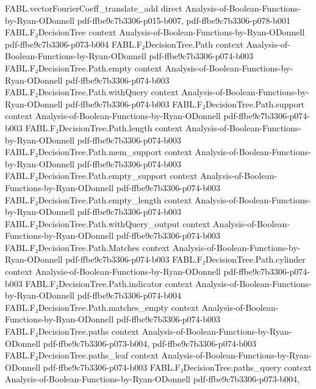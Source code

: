 \begin{theorem}
  {FABL.vectorFourierCoeff_translate_add}
  {direct}
  {Analysis-of-Boolean-Functions-by-Ryan-ODonnell}
  {pdf-ffbe9c7b3306-p015-b007,
    pdf-ffbe9c7b3306-p078-b001}
\proofstep
  {FABL.F₂DecisionTree}
  {context}
  {Analysis-of-Boolean-Functions-by-Ryan-ODonnell}
  {pdf-ffbe9c7b3306-p073-b004}
\proofstep
  {FABL.F₂DecisionTree.Path}
  {context}
  {Analysis-of-Boolean-Functions-by-Ryan-ODonnell}
  {pdf-ffbe9c7b3306-p074-b003}
\proofstep
  {FABL.F₂DecisionTree.Path.empty}
  {context}
  {Analysis-of-Boolean-Functions-by-Ryan-ODonnell}
  {pdf-ffbe9c7b3306-p074-b003}
\proofstep
  {FABL.F₂DecisionTree.Path.withQuery}
  {context}
  {Analysis-of-Boolean-Functions-by-Ryan-ODonnell}
  {pdf-ffbe9c7b3306-p074-b003}
\proofstep
  {FABL.F₂DecisionTree.Path.support}
  {context}
  {Analysis-of-Boolean-Functions-by-Ryan-ODonnell}
  {pdf-ffbe9c7b3306-p074-b003}
\proofstep
  {FABL.F₂DecisionTree.Path.length}
  {context}
  {Analysis-of-Boolean-Functions-by-Ryan-ODonnell}
  {pdf-ffbe9c7b3306-p074-b003}
\proofstep
  {FABL.F₂DecisionTree.Path.mem_support}
  {context}
  {Analysis-of-Boolean-Functions-by-Ryan-ODonnell}
  {pdf-ffbe9c7b3306-p074-b003}
\proofstep
  {FABL.F₂DecisionTree.Path.empty_support}
  {context}
  {Analysis-of-Boolean-Functions-by-Ryan-ODonnell}
  {pdf-ffbe9c7b3306-p074-b003}
\proofstep
  {FABL.F₂DecisionTree.Path.empty_length}
  {context}
  {Analysis-of-Boolean-Functions-by-Ryan-ODonnell}
  {pdf-ffbe9c7b3306-p074-b003}
\proofstep
  {FABL.F₂DecisionTree.Path.withQuery_output}
  {context}
  {Analysis-of-Boolean-Functions-by-Ryan-ODonnell}
  {pdf-ffbe9c7b3306-p074-b003}
\proofstep
  {FABL.F₂DecisionTree.Path.Matches}
  {context}
  {Analysis-of-Boolean-Functions-by-Ryan-ODonnell}
  {pdf-ffbe9c7b3306-p074-b003}
\proofstep
  {FABL.F₂DecisionTree.Path.cylinder}
  {context}
  {Analysis-of-Boolean-Functions-by-Ryan-ODonnell}
  {pdf-ffbe9c7b3306-p074-b003}
\proofstep
  {FABL.F₂DecisionTree.Path.indicator}
  {context}
  {Analysis-of-Boolean-Functions-by-Ryan-ODonnell}
  {pdf-ffbe9c7b3306-p074-b004}
\proofstep
  {FABL.F₂DecisionTree.Path.matches_empty}
  {context}
  {Analysis-of-Boolean-Functions-by-Ryan-ODonnell}
  {pdf-ffbe9c7b3306-p074-b003}
\proofstep
  {FABL.F₂DecisionTree.paths}
  {context}
  {Analysis-of-Boolean-Functions-by-Ryan-ODonnell}
  {pdf-ffbe9c7b3306-p073-b004,
    pdf-ffbe9c7b3306-p074-b003}
\proofstep
  {FABL.F₂DecisionTree.paths_leaf}
  {context}
  {Analysis-of-Boolean-Functions-by-Ryan-ODonnell}
  {pdf-ffbe9c7b3306-p074-b003}
\proofstep
  {FABL.F₂DecisionTree.paths_query}
  {context}
  {Analysis-of-Boolean-Functions-by-Ryan-ODonnell}
  {pdf-ffbe9c7b3306-p073-b004,
}
\end{theorem}
